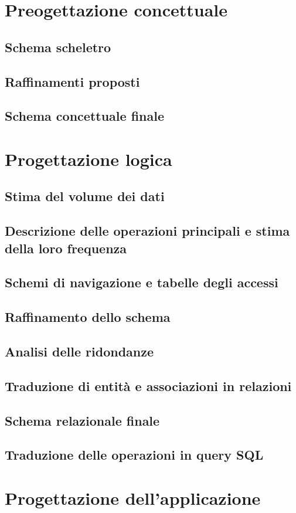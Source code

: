 \documentclass[a4paper,11pt]{report}
\begin{document}
\chapter{Preogettazione concettuale}
\section{Schema scheletro}
\section{Raffinamenti proposti}

\section{Schema concettuale finale}


\chapter{Progettazione logica}
\section{Stima del volume dei dati}

\section{Descrizione delle operazioni principali e stima della loro frequenza}

\section{Schemi di navigazione e tabelle degli accessi}

\section{Raffinamento dello schema}

\section{Analisi delle ridondanze}

\section{Traduzione di entità e associazioni in relazioni}

\section{Schema relazionale finale}

\section{Traduzione delle operazioni in query SQL}


\chapter{Progettazione dell'applicazione}
\end{document}
